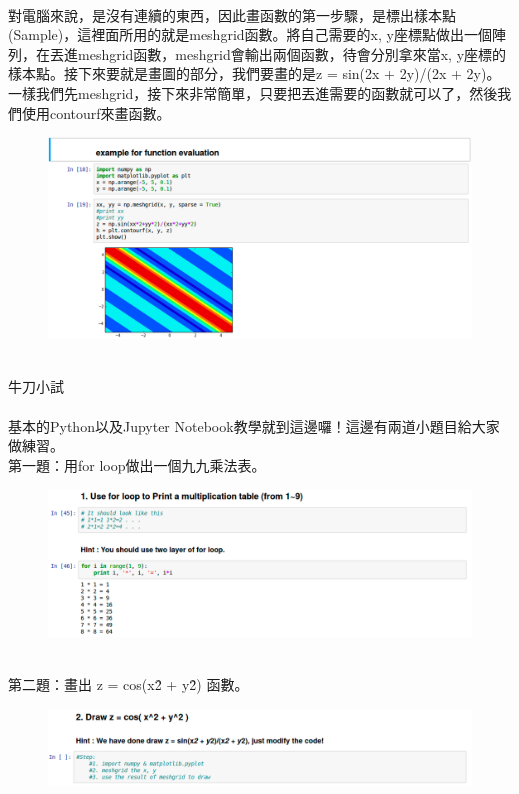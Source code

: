 \documentclass{article}
\begin{document}
\\
對電腦來說，是沒有連續的東西，因此畫函數的第一步驟，是標出樣本點(Sample)，這裡面所用的就是meshgrid函數。將自己需要的x, y座標點做出一個陣列，在丟進meshgrid函數，meshgrid會輸出兩個函數，待會分別拿來當x, y座標的樣本點。接下來要就是畫圖的部分，我們要畫的是z = sin(2x + 2y)/(2x + 2y)。一樣我們先meshgrid，接下來非常簡單，只要把丟進需要的函數就可以了，然後我們使用contourf來畫函數。
\begin{figure}[htp]
    \begin{center}
        \includegraphics[width=400pt]{pic/3_1_12.png}
    \end{center}
\end{figure}
\\
牛刀小試
\\\\基本的Python以及Jupyter Notebook教學就到這邊囉！這邊有兩道小題目給大家做練習。
\\第一題：用for loop做出一個九九乘法表。
\
\begin{figure}[htp]
    \begin{center}
        \includegraphics[width=400pt]{pic/3_1_13.png}
    \end{center}
\end{figure}
\\
第二題：畫出 z = cos(x\^2 + y\^2) 函數。
\
\begin{figure}[htp]
    \begin{center}
        \includegraphics[width=400pt]{pic/3_1_14.png}
    \end{center}
\end{figure}
\\
\end{document}
